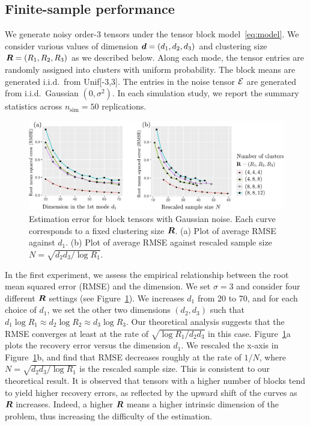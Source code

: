 \documentclass{article}
\begin{document}

\subsection{Finite-sample performance}

We generate noisy order-3 tensors under the tensor block model~\eqref{eq:model}. We consider various values of dimension $\bm{d}=(d_1,d_2,d_3)$ and clustering size $\bm{R}=(R_1,R_2,R_3)$ as we described below. Along each mode, the tensor entries are randomly assigned into clusters with uniform probability. The block means are generated i.i.d.\ from Unif[-3,3]. The entries in the noise tensor $\mathcal{E}$ are generated from i.i.d.\ Gaussian $(0,\sigma^2)$. In each simulation study, we report the summary statistics across $n_{\text{sim}}=50$ replications. 

\begin{figure}[http]
\centering
\includegraphics[width=1\textwidth]{figures/figure3/decay.pdf}
\caption{Estimation error for block tensors with Gaussian noise. Each curve corresponds to a fixed clustering size $\bm{R}$. (a) Plot of average RMSE against $d_1$. (b) Plot of average RMSE against rescaled sample size $N=\sqrt{d_2d_3/\log R_1}$. 
}\label{fig:RMSE}
\end{figure}

In the first experiment, we assess the empirical relationship between the root mean squared error (RMSE) and the dimension. We set $\sigma=3$ and consider four different $\bm{R}$ settings (see Figure~\ref{fig:RMSE}). We increases $d_1$ from 20 to 70, and for each choice of $d_1$, we set the other two dimensions $(d_2,d_3)$ such that $d_1\log R_1\approx d_2\log R_2\approx d_3\log R_3$. Our theoretical analysis suggests that the RMSE converges at least at the rate of $\sqrt{\log R_1/d_2d_3}$ in this case. Figure~\ref{fig:RMSE}a plots the recovery error versus the dimension $d_1$. We rescaled the x-axis in Figure~\ref{fig:RMSE}b, and find that RMSE decreases roughly at the rate of $1/N$, where $N=\sqrt{d_2d_3/\log R_1}$ is the rescaled sample size. This is consistent to our theoretical result. It is observed that tensors with a higher number of blocks tend to yield higher recovery errors, as reflected by the upward shift of the curves as $\bm{R}$ increases. Indeed, a higher $\bm{R}$ means a higher intrinsic dimension of the problem, thus increasing the difficulty of the estimation. 
\end{document}
